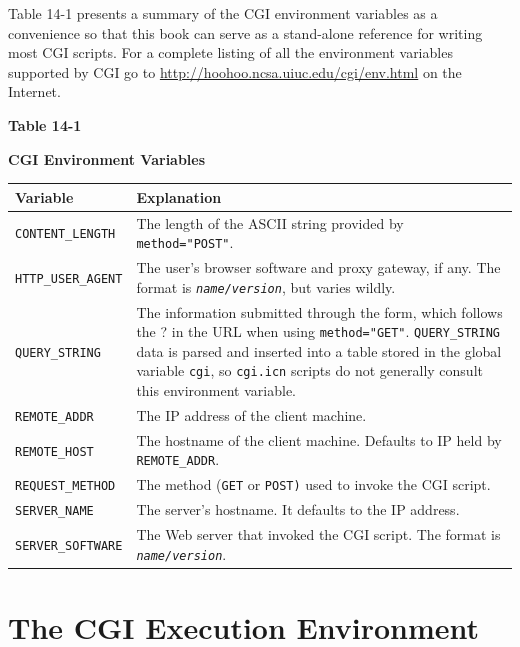 
Table 14-1 presents a summary of the CGI environment variables as a
convenience so that this book can serve as a stand-alone reference for
writing most CGI scripts. For a complete listing of all the environment
variables supported by CGI go to
\url{http://hoohoo.ncsa.uiuc.edu/cgi/env.html} on the Internet.

{\centering\sffamily\bfseries Table 14-1}

{\centering\sffamily\bfseries CGI Environment Variables}

\begin{flushleft}
\tablehead{}
\begin{xtabular}{|m{1.65in}|m{4.15in}|}
\hline
\sffamily\bfseries Variable &
\sffamily\bfseries Explanation\\\hline
\texttt{CONTENT\_LENGTH} &
The length of the ASCII string provided by
\texttt{method="POST"}.\\\hline
\texttt{HTTP\_USER\_AGENT} &
The user's browser software and proxy gateway, if any.
The format is \texttt{\textit{name/version}}, but varies
wildly.\\\hline
\texttt{QUERY\_STRING} &
The information submitted through the form, which follows the ? in the
URL when using \texttt{method="GET"}.
\texttt{QUERY\_STRING} data is parsed and inserted into a table
stored in the global variable \texttt{cgi}, so
\texttt{cgi.icn} scripts do not generally consult this environment
variable.\\\hline
\texttt{REMOTE\_ADDR} &
The IP address of the client machine.\\\hline
\texttt{REMOTE\_HOST} &
The hostname of the client machine. Defaults to IP held by
\texttt{REMOTE\_ADDR}.\\\hline
\texttt{REQUEST\_METHOD} &
The method (\texttt{GET} or \texttt{POST)} used to invoke the CGI
script.\\\hline
\texttt{SERVER\_NAME} &
The server's hostname. It defaults to the IP
address.\\\hline
\texttt{SERVER\_SOFTWARE} &
The Web server that invoked the CGI script. The format is
\texttt{\textit{name/version}}.\\\hline
\end{xtabular}
\end{flushleft}

\section{The CGI Execution Environment}

